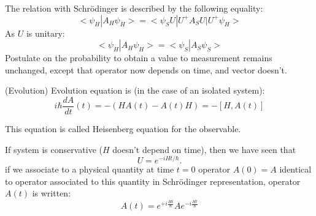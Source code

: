 \documentclass[12pt]{book}
\begin{document}
The relation with Schr\"odinger is described by the following equality:
\begin{equation}
<\psi_H|A_H\psi_H>=<\psi_SU|U^+A_SU|U^+\psi_H>
\end{equation}
As $U$ is unitary:
\begin{equation}
<\psi_H|A_H\psi_H>=<\psi_S|A_S\psi_S>
\end{equation}
Postulate on the probability to obtain a value to measurement remains
unchanged, except that operator now depends on time, and vector doesn't.
\begin{postulat}(Evolution)
Evolution equation is (in the case of an isolated system):
\begin{equation}
i\hbar \frac{dA}{dt}(t)=-(HA(t)-A(t)H)=-[H,A(t)]
\end{equation}
\end{postulat}
This equation is called Heisenberg equation for the observable.
\begin{rem}
If system is conservative ($H$ doesn't depend on time), then we have seen that
\begin{equation}
U=e^{-iHt/\hbar}.
\end{equation}
if we associate to a physical quantity at time $t=0$
operator $A(0)=A$ identical to operator associated to this quantity in
Schr\"odinger representation, operator
$A(t)$ is written:
\begin{equation}
A(t)=e^{+i\frac{Ht}{\hbar}}A e^{-i\frac{Ht}{\hbar}}
\end{equation}
\end{rem}
\end{document}
